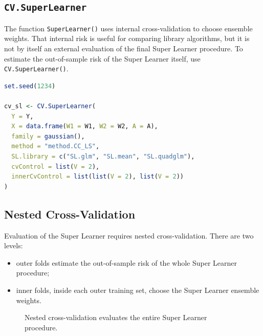 \label{lec:6-7}

\subsection{\texttt{CV.SuperLearner}}

The function \texttt{SuperLearner()} uses internal cross-validation to choose ensemble
weights. That internal risk is useful for comparing library algorithms, but it is not by
itself an external evaluation of the final Super Learner procedure. To estimate the
out-of-sample risk of the Super Learner itself, use \texttt{CV.SuperLearner()}.

\begin{implementationbox}
\begin{lstlisting}[language=R]
set.seed(1234)

cv_sl <- CV.SuperLearner(
  Y = Y,
  X = data.frame(W1 = W1, W2 = W2, A = A),
  family = gaussian(),
  method = "method.CC_LS",
  SL.library = c("SL.glm", "SL.mean", "SL.quadglm"),
  cvControl = list(V = 2),
  innerCvControl = list(list(V = 2), list(V = 2))
)
\end{lstlisting}
\end{implementationbox}

\subsection{Nested Cross-Validation}

Evaluation of the Super Learner requires nested cross-validation. There are two
levels:
\begin{itemize}
\item outer folds estimate the out-of-sample risk of the whole Super Learner
procedure;
\item inner folds, inside each outer training set, choose the Super Learner ensemble
weights.
\end{itemize}

\begin{figure}[H]
\centering
{}
\caption{Nested cross-validation evaluates the entire Super Learner procedure.}
\label{fig:ch6-nested-cv}
\end{figure}

